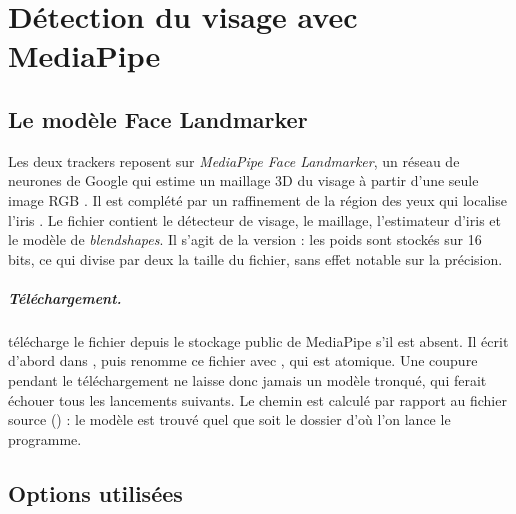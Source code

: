 \chapter{Détection du visage avec MediaPipe}
\label{chap:mediapipe}

\section{Le modèle Face Landmarker}

Les deux trackers reposent sur \emph{MediaPipe Face Landmarker}, un réseau de neurones de Google qui estime un maillage 3D du visage à partir d'une seule image RGB \cite{kartynnik2019}. Il est complété par un raffinement de la région des yeux qui localise l'iris \cite{ablavatski2020}. Le fichier  contient le détecteur de visage, le maillage, l'estimateur d'iris et le modèle de \emph{blendshapes}. Il s'agit de la version  : les poids sont stockés sur 16 bits, ce qui divise par deux la taille du fichier, sans effet notable sur la précision.

\paragraph{Téléchargement.}  télécharge le fichier depuis le stockage public de MediaPipe s'il est absent. Il écrit d'abord dans , puis renomme ce fichier avec , qui est atomique. Une coupure pendant le téléchargement ne laisse donc jamais un modèle tronqué, qui ferait échouer tous les lancements suivants. Le chemin est calculé par rapport au fichier source () : le modèle est trouvé quel que soit le dossier d'où l'on lance le programme.

\section{Options utilisées}

